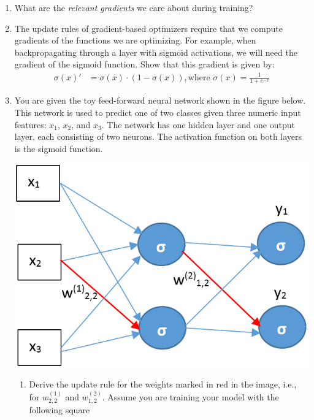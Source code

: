 \documentclass[11pt,a4paper]{article}
\begin{document}
\begin{enumerate}[label=(\alph*)]
    \item What are the \emph{relevant gradients} we care about during training?
    \item The update rules of gradient-based optimizers require that we compute
          gradients of the functions we are optimizing. For example, when
          backpropagating through a layer with sigmoid activations, we will need
          the gradient of the sigmoid function. Show that this gradient is given
          by:
          \begin{align*}
              \sigma(x)' & = \sigma(x) \cdot (1 - \sigma(x)), \text{where } \sigma(x) = \frac{1}{1 + e^{-x}}
          \end{align*}
    \item You are given the toy feed-forward neural network shown in the figure
          below. 
          This network is used to predict one of two classes given three numeric
          input features: $x_1$, $x_2$, and $x_3$. 
          The network has one hidden layer and one output layer, each consisting 
          of two neurons. 
          The activation function on both layers is the sigmoid function.
          \begin{center}
              \includegraphics[scale=0.4]{img/backprop_2.png}
          \end{center}
          \begin{enumerate}[label=(\roman*)]
              \item Derive the update rule for the weights marked in red in the
                    image, i.e., for $w^{(1)}_{2,2}$ and $w^{(2)}_{1,2}$.
                    Assume you are training your model with the following square 

\end{enumerate}
\end{enumerate}
\end{document}
